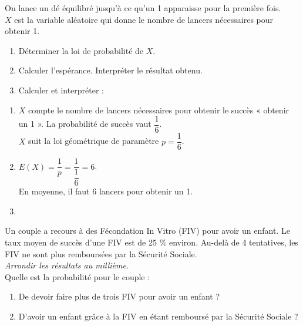 \documentclass[a4paper,11pt,exos]{nsi} %
\begin{document}
\exo{}%
\textcolor{UGLiBlue}{On lance un dé équilibré jusqu'à ce qu'un 1 apparaisse pour la première fois.\\
$X$ est la variable aléatoire qui donne le nombre de lancers nécessaires pour obtenir 1.
\begin{enumerate}
    \item Déterminer la loi de probabilité de $X$.
    \item Calculer l'espérance. Interpréter le résultat obtenu.
    \item Calculer et interpréter :
    \begin{multicols}{3}
    \end{multicols}
\end{enumerate}}

\begin{enumerate}
    \item $X$ compte le nombre de lancers nécessaires pour obtenir le succès « obtenir un 1 ». La probabilité de succès vaut $\dfrac{1}{6}$.\\
    $X$ suit la loi géométrique de paramètre $p=\dfrac{1}{6}$.
    \item $E(X)=\dfrac{1}{p}=\dfrac{1}{\dfrac{1}{6}}=6$.\\
    En moyenne, il faut 6 lancers pour obtenir un 1.
    \item {}
\end{enumerate}

\exo{}
\textcolor{UGLiBlue}{Un couple a recours à des Fécondation In Vitro (FIV) pour avoir un enfant. Le taux moyen de succès d'une FIV est de 25 \% environ. Au-delà de 4 tentatives, les FIV ne sont plus remboursées par la Sécurité Sociale.\\
\textit{Arrondir les résultats au millième.}\\
Quelle est la probabilité pour le couple :
\begin{enumerate}
    \item De devoir faire plus de trois FIV pour avoir un enfant ?
    \item D'avoir un enfant grâce à la FIV en étant remboursé par la Sécurité Sociale ?
\end{enumerate}}
\end{document}
